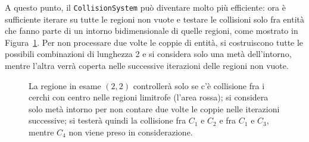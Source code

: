 A questo punto, il \texttt{CollisionSystem} può diventare molto più efficiente: ora è sufficiente iterare su tutte le
regioni non vuote e testare le collisioni solo fra entità che fanno parte di un intorno bidimensionale di quelle
regioni, come mostrato in Figura~\ref{fig:space-partition}.
Per non processare due volte le coppie di entità, si costruiscono tutte le possibili combinazioni di lunghezza 2 e si
considera solo una metà dell'intorno, mentre l'altra verrà coperta nelle successive iterazioni delle regioni non vuote.

\begin{figure}[H]
    \centering
    \caption{La regione in esame $(2, 2)$ controllerà solo se c'è collisione fra i cerchi con centro nelle regioni
    limitrofe (l'area rossa);
    si considera solo metà intorno per non contare due volte le coppie nelle iterazioni successive;
    si testerà quindi la collisione fra $C_1$ e $C_2$ e fra $C_1$ e $C_3$, mentre $C_4$ non viene preso in
    considerazione.}
    \label{fig:space-partition}
\end{figure}

